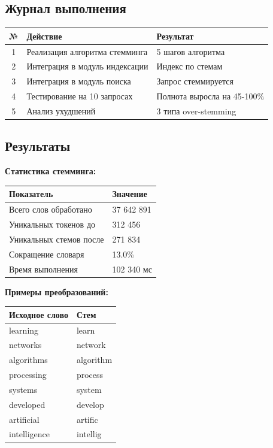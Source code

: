 \documentclass[a4paper, 12pt]{article}
\begin{document}
\subsection*{Журнал выполнения}
\begin{table}[h]
\centering
\begin{tabular}{|c|l|l|}
\hline
\textbf{№} & \textbf{Действие} & \textbf{Результат} \\ \hline
1 & Реализация алгоритма стемминга & 5 шагов алгоритма \\ \hline
2 & Интеграция в модуль индексации & Индекс по стемам \\ \hline
3 & Интеграция в модуль поиска & Запрос стеммируется \\ \hline
4 & Тестирование на 10 запросах & Полнота выросла на 45-100\% \\ \hline
5 & Анализ ухудшений & 3 типа over-stemming \\ \hline
\end{tabular}
\end{table}

\subsection*{Результаты}
\textbf{Статистика стемминга:}
\begin{table}[h]
\begin{tabular}{|l|l|}
\hline
\textbf{Показатель} & \textbf{Значение} \\ \hline
Всего слов обработано & 37 642 891 \\ \hline
Уникальных токенов до & 312 456 \\ \hline
Уникальных стемов после & 271 834 \\ \hline
Сокращение словаря & 13.0\% \\ \hline
Время выполнения & 102 340 мс \\ \hline
\end{tabular}
\end{table}

\textbf{Примеры преобразований:}
\begin{table}[h]
\begin{tabular}{|l|l|}
\hline
\textbf{Исходное слово} & \textbf{Стем} \\ \hline
learning & learn \\ \hline
networks & network \\ \hline
algorithms & algorithm \\ \hline
processing & process \\ \hline
systems & system \\ \hline
developed & develop \\ \hline
artificial & artific \\ \hline
intelligence & intellig \\ \hline
\end{tabular}
\end{table}
\end{document}
